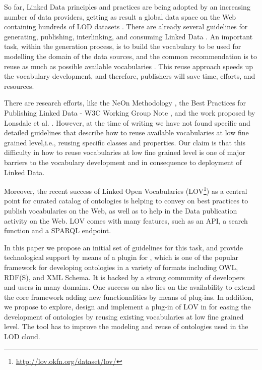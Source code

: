 So far, Linked Data principles and practices are being adopted by an increasing number of data providers, getting as result a global data space on the Web containing hundreds of LOD datasets \cite{Heath_Bizer_2011}. There are already several guidelines for generating, publishing, interlinking, and consuming Linked Data \cite{Heath_Bizer_2011}. An important task, within the generation process, is to build the vocabulary to be used for modelling the domain of the data sources, and the common recommendation is to reuse as much as possible available vocabularies \cite{Heath_Bizer_2011,hyland14}. This reuse approach speeds up the vocabulary development, and therefore, publishers will save time, efforts, and resources. 

There are research efforts, like the NeOn Methodology \cite{suarezfigueroa2012ontology}, the Best Practices for Publishing Linked Data - W3C Working Group Note \cite{hyland14}, and the work proposed by Lonsdale et al. \cite{Lonsdale2010318}. However, at the time of writing we have not found specific and detailed guidelines that describe how to reuse available vocabularies at low fine grained level,i.e., reusing specific classes and properties. Our claim is that this difficulty in how to reuse vocabularies at low fine grained level is one of major barriers to the vocabulary development and in consequence to deployment of Linked Data.

Moreover, the recent success of Linked Open Vocabularies (LOV\footnote{\url{http://lov.okfn.org/dataset/lov/}}) as a central point for curated catalog of ontologies is helping to convey on best practices to publish vocabularies on the Web, as well as to help in the Data publication activity on the Web. LOV comes with many features, such as an API, a search function and a SPARQL endpoint.

In this paper we propose an initial set of guidelines for this task, and provide technological support by means of a plugin for \protege, which is one of the popular framework for developing ontologies in a variety of formats including OWL, RDF(S), and XML Schema. It is backed by a strong community of developers and users in many domains. One success on \protege also lies on the availability to extend the core framework adding new functionalities by means of plug-ins. In addition, we propose to explore, design and implement a plug-in of LOV in \protege for easing the development of ontologies by reusing existing vocabularies at low fine grained level. The tool has to improve the modeling and reuse of ontologies used in the LOD cloud.


